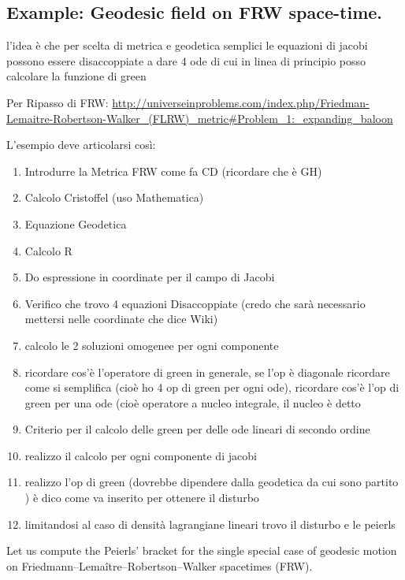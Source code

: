 \documentclass[Main]{subfiles}
\begin{document}
\subsection{Example: Geodesic field on FRW space-time.}
\ifToninus
	\begin{Warning}
	l'idea è che per scelta di metrica e geodetica semplici le equazioni di jacobi possono essere disaccoppiate a dare 4 ode di cui in linea di principio posso calcolare la funzione di green	

	\vspace{2mm}
	Per Ripasso di FRW: \url{http://universeinproblems.com/index.php/Friedman-Lemaitre-Robertson-Walker_(FLRW)_metric#Problem_1:_expanding_baloon}

	\vspace{2mm}
	L'esempio deve articolarsi così:
		\begin{enumerate}
			\item Introdurre la Metrica FRW come fa CD (ricordare che è GH)
			\item Calcolo Cristoffel (uso Mathematica)
			\item Equazione Geodetica
			\item Calcolo R
			\item Do espressione in coordinate per il campo di Jacobi
			\item Verifico che trovo 4 equazioni Disaccoppiate (credo che sarà necessario mettersi nelle coordinate che dice Wiki)
			\item calcolo le 2 soluzioni omogenee per ogni componente
			\item ricordare cos'è l'operatore di green in generale, se l'op è diagonale ricordare come si semplifica (cioè ho 4 op di green per ogni ode), ricordare cos'è l'op di green per una ode (cioè operatore  a nucleo integrale, il nucleo è detto 
			\item Criterio per il calcolo delle green per delle ode lineari di secondo ordine
			\item realizzo il calcolo per ogni componente di jacobi
			\item realizzo l'op di green (dovrebbe dipendere dalla geodetica da cui sono partito ) è dico come va inserito per ottenere il disturbo
			\item limitandosi al caso di densità lagrangiane lineari trovo il disturbo e le peierls
		\end{enumerate}
	\end{Warning}
\fi	
	Let us compute the Peierls' bracket for the single special case of geodesic motion on Friedmann–Lemaître–Robertson–Walker spacetimes (FRW).
	
\end{document}
